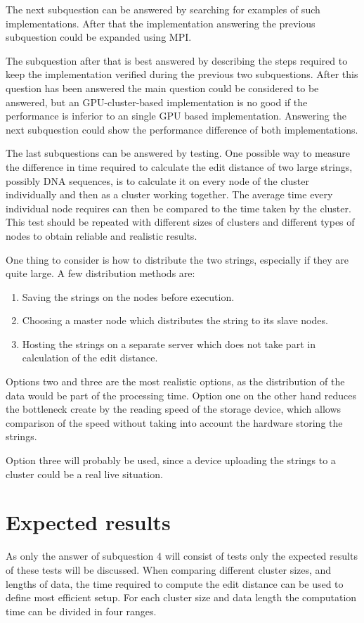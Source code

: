 \documentclass{sig-alternate-br}
\begin{document}
The next subquestion can be answered by searching for examples of such implementations.
After that the implementation answering the previous subquestion could be expanded using MPI.

The subquestion after that is best answered by describing the steps required to keep the implementation verified during the previous two subquestions.
After this question has been answered the main question could be considered to be answered, but an GPU-cluster-based implementation is no good if the performance is inferior to an single GPU based implementation.
Answering the next subquestion could show the performance difference of both implementations.

The last subquestions can be answered by testing.
One possible way to measure the difference in time required to calculate the edit distance of two large strings, possibly DNA sequences, is to calculate it on every node of the cluster individually and then as a cluster working together.
The average time every individual node requires can then be compared to the time taken by the cluster.
This test should be repeated with different sizes of clusters and different types of nodes to obtain reliable and realistic results.

One thing to consider is how to distribute the two strings, especially if they are quite large. A few distribution methods are:
\begin{enumerate}
    \item Saving the strings on the nodes before execution.
    \item Choosing a master node which distributes the string to its slave nodes.
    \item Hosting the strings on a separate server which does not take part in calculation of the edit distance.
\end{enumerate}
Options two and three are the most realistic options, as the distribution of the data would be part of the processing time. Option one on the other hand reduces the bottleneck create by the reading speed of the storage device, which allows comparison of the speed without taking into account the hardware storing the strings.

Option three will probably be used, since a device uploading the strings to a cluster could be a real live situation.

\section{Expected results}
As only the answer of subquestion 4 will consist of tests only the expected results of these tests will be discussed.
When comparing different cluster sizes, and lengths of data, the time required to compute the edit distance can be used to define most efficient setup.
For each cluster size and data length the computation time can be divided in four ranges.
\end{document}
